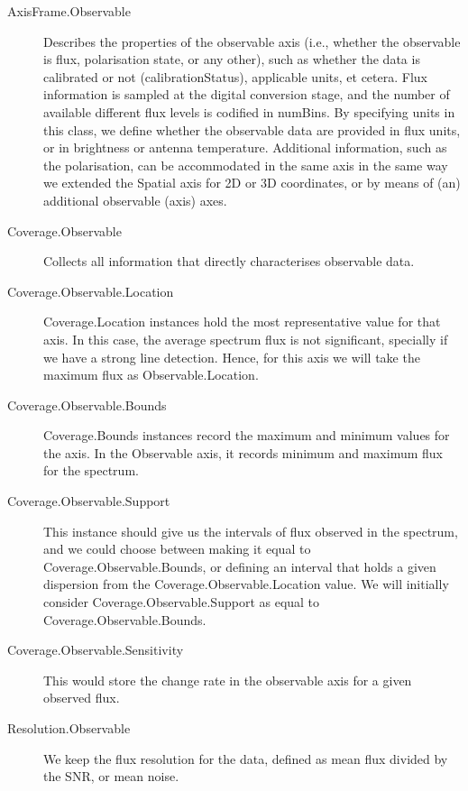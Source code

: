 			\begin{description}
				\item[AxisFrame.Observable] Describes the 
				properties of the observable axis (i.e., whether the
				observable is flux,
				polarisation state, or any other), such as whether
				the data is calibrated or not (calibrationStatus),
				applicable units, et cetera. Flux information is
				sampled at the digital conversion stage, and the
				number of available different flux levels is
				codified in numBins. By specifying units in this
				class, we define whether the observable data are
				provided in flux units, or in brightness or antenna
				temperature. Additional information, such as the
				polarisation, can be accommodated in the same axis
				in the same way we extended the Spatial axis for 2D
				or 3D coordinates, or by means of (an) additional
				observable (axis) axes.
				
				 \item[Coverage.Observable] Collects all
				information that directly characterises observable
				data.
				
				 \item[Coverage.Observable.Location]
				Coverage.Location instances hold the most
				representative value for that axis. In this case,
				the average spectrum flux is not significant,
				specially if we have a strong line detection.
				Hence, for this axis we will take the maximum flux
				as Observable.Location.
				
				 \item[Coverage.Observable.Bounds] Coverage.Bounds
				instances record the maximum and minimum values for
				the axis. In the Observable axis, it records
				minimum and maximum flux for the spectrum.
				
				 \item[Coverage.Observable.Support] This instance
				should give us the intervals of flux observed in
				the spectrum, and we could choose between making it
				equal to Coverage.Observable.Bounds, or defining an
				interval that holds a given dispersion from the
				Coverage.Observable.Location value. We will
				initially consider Coverage.Observable.Support as
				equal to Coverage.Observable.Bounds.
				
				 \item[Coverage.Observable.Sensitivity] This would
				store the change rate in the observable axis for a
				given observed flux.
				
				 \item[Resolution.Observable] We keep the flux
				resolution for the data, defined as mean flux
				divided by the SNR, or mean noise.
				

\end{description}
